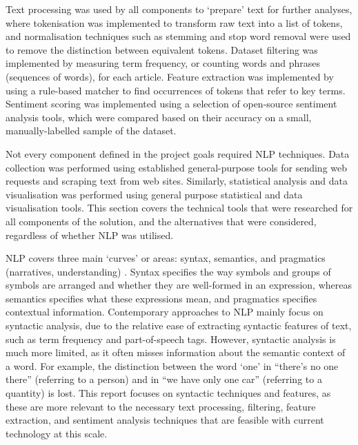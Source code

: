 \documentclass{report}
\begin{document}
Text processing was used by all components to `prepare' text for further analyses, where tokenisation was implemented to transform raw text into a list of tokens, and normalisation techniques such as stemming and stop word removal \cite{Nltk} were used to remove the distinction between equivalent tokens.
Dataset filtering was implemented by measuring term frequency, or counting words and phrases (sequences of words), for each article.
Feature extraction was implemented by using a rule-based matcher to find occurrences of tokens that refer to key terms.
Sentiment scoring was implemented using a selection of open-source sentiment analysis tools, which were compared based on their accuracy on a small, manually-labelled sample of the dataset.

Not every component defined in the project goals required NLP techniques.
Data collection was performed using established general-purpose tools for sending web requests and scraping text from web sites.
Similarly, statistical analysis and data visualisation was performed using general purpose statistical and data visualisation tools.
This section covers the technical tools that were researched for all components of the solution, and the alternatives that were considered, regardless of whether NLP was utilised.

NLP covers three main `curves' or areas: syntax, semantics, and pragmatics (narratives, understanding) \cite{cambria2014jumping}. 
Syntax specifies the way symbols and groups of symbols are arranged and whether they are well-formed in an expression, whereas semantics specifies what these expressions mean, and pragmatics specifies contextual information.
Contemporary approaches to NLP mainly focus on syntactic analysis, due to the relative ease of extracting syntactic features of text, such as term frequency and part-of-speech tags.
However, syntactic analysis is much more limited, as it often misses information about the semantic context of a word.
For example, the distinction between the word `one' in ``there's no one there'' (referring to a person) and in ``we have only one car'' (referring to a quantity) is lost.
This report focuses on syntactic techniques and features, as these are more relevant to the necessary text processing, filtering, feature extraction, and sentiment analysis techniques that are feasible with current technology at this scale.
\end{document}
